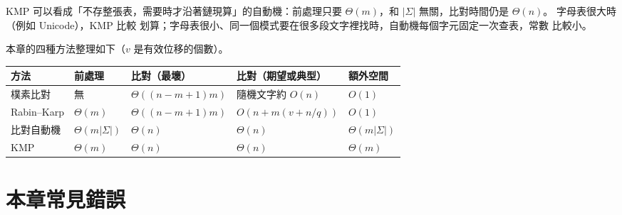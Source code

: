 KMP 可以看成「不存整張表，需要時才沿著鏈現算」的自動機：前處理只要 $\Theta(m)$，和
$|\Sigma|$ 無關，比對時間仍是 $\Theta(n)$。 字母表很大時（例如 Unicode），KMP 比較
划算；字母表很小、同一個模式要在很多段文字裡找時，自動機每個字元固定一次查表，常數
比較小。

本章的四種方法整理如下（$v$ 是有效位移的個數）。

\begin{center}
\small
\begin{tabular}{lllll}
\toprule
方法 & 前處理 & 比對（最壞） & 比對（期望或典型） & 額外空間 \\
\midrule
樸素比對 & 無 & $\Theta((n - m + 1)m)$ & 隨機文字約 $O(n)$ & $O(1)$ \\
Rabin--Karp & $\Theta(m)$ & $\Theta((n - m + 1)m)$ & $O(n + m(v + n/q))$ & $O(1)$ \\
比對自動機 & $\Theta(m|\Sigma|)$ & $\Theta(n)$ & $\Theta(n)$ & $\Theta(m|\Sigma|)$ \\
KMP & $\Theta(m)$ & $\Theta(n)$ & $\Theta(n)$ & $\Theta(m)$ \\
\bottomrule
\end{tabular}
\end{center}

\section{本章常見錯誤}
\label{sec:stm-pitfalls}

